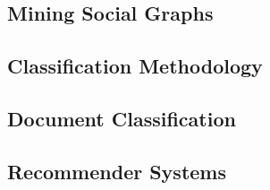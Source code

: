 \documentclass[a4paper]{article}
\begin{document}
  

  

  \subsection{Mining Social Graphs} %
  \label{sub:mining_social_graphs}

  \subsection{Classification Methodology} %
  \label{sub:classification_methodology}

  \subsection{Document Classification} %
  \label{sub:document_classification}

  \subsection{Recommender Systems} %
  \label{sub:recommender_systems}
\end{document}
